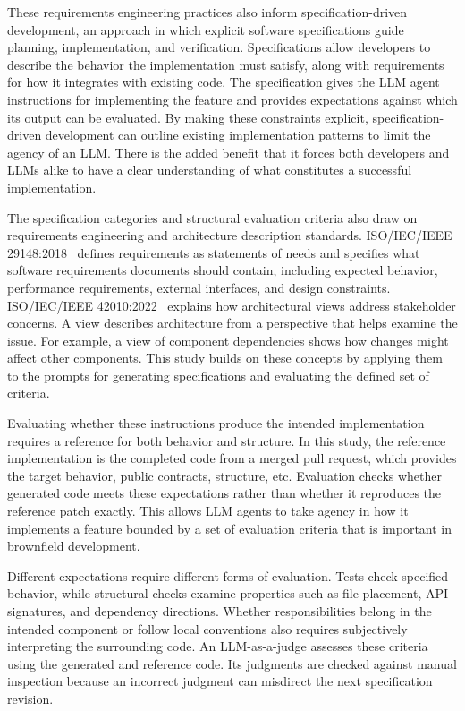 \documentclass[sigconf,nonacm]{acmart}
\begin{document}
These requirements engineering practices also inform specification-driven development, an approach in which explicit software specifications guide planning, implementation, and verification. Specifications allow developers to describe the behavior the implementation must satisfy, along with requirements for how it integrates with existing code. The specification gives the LLM agent instructions for implementing the feature and provides expectations against which its output can be evaluated. By making these constraints explicit, specification-driven development can outline existing implementation patterns to limit the agency of an LLM. There is the added benefit that it forces both developers and LLMs alike to have a clear understanding of what constitutes a successful implementation.

The specification categories and structural evaluation criteria also draw on requirements engineering and architecture description standards. ISO/IEC/IEEE 29148:2018~\citep{iso29148} defines requirements as statements of needs and specifies what software requirements documents should contain, including expected behavior, performance requirements, external interfaces, and design constraints. ISO/IEC/IEEE 42010:2022~\citep{iso42010} explains how architectural views address stakeholder concerns. A view describes architecture from a perspective that helps examine the issue. For example, a view of component dependencies shows how changes might affect other components. This study builds on these concepts by applying them to the prompts for generating specifications and evaluating the defined set of criteria.

Evaluating whether these instructions produce the intended implementation requires a reference for both behavior and structure. In this study, the reference implementation is the completed code from a merged pull request, which provides the target behavior, public contracts, structure, etc. Evaluation checks whether generated code meets these expectations rather than whether it reproduces the reference patch exactly. This allows LLM agents to take agency in how it implements a feature bounded by a set of evaluation criteria that is important in brownfield development.

Different expectations require different forms of evaluation. Tests check specified behavior, while structural checks examine properties such as file placement, API signatures, and dependency directions. Whether responsibilities belong in the intended component or follow local conventions also requires subjectively interpreting the surrounding code. An LLM-as-a-judge assesses these criteria using the generated and reference code. Its judgments are checked against manual inspection because an incorrect judgment can misdirect the next specification revision.
\end{document}
